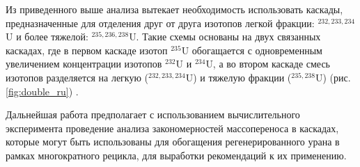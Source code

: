 Из приведенного выше анализа вытекает необходимость использовать каскады, предназначенные для отделения друг от друга изотопов легкой фракции: $^{232,233,234}$U и более тяжелой: $^{235,236,238}$U. Такие схемы основаны на двух связанных каскадах, где в первом каскаде изотоп $^{235}$U обогащается с одновременным увеличением концентрации изотопов $^{232}$U и $^{234}$U, а во втором каскаде смесь изотопов разделяется на легкую ($^{232,233,234}$U) и тяжелую фракции ($^{235,238}$U) (рис. \ref{fig:double_ru}) \cite{smirnovApplyingEnrichmentCapacities2018}.

Дальнейшая работа предполагает с использованием вычислительного эксперимента проведение анализа закономерностей массопереноса в каскадах, которые могут быть использованы для обогащения регенерированного урана в рамках многократного рецикла, для выработки рекомендаций к их применению.



\clearpage